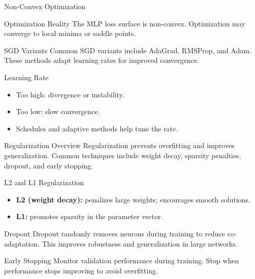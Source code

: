 \documentclass[10pt]{beamer}
\begin{document}
\begin{frame}{Non-Convex Optimization}
  \justifying
  \begin{warningbox}{Optimization Reality}
    The MLP loss surface is non-convex. Optimization may converge to local minima or saddle points.
  \end{warningbox}
\end{frame}

\begin{frame}{SGD Variants}
  \justifying
  Common SGD variants include AdaGrad, RMSProp, and Adam.
  These methods adapt learning rates for improved convergence.
\end{frame}

\begin{frame}{Learning Rate}
  \justifying
  \begin{itemize}
    \item Too high: divergence or instability.
    \item Too low: slow convergence.
    \item Schedules and adaptive methods help tune the rate.
  \end{itemize}
\end{frame}

\begin{frame}{Regularization Overview}
  \justifying
  Regularization prevents overfitting and improves generalization.
  Common techniques include weight decay, sparsity penalties, dropout, and early stopping.
\end{frame}

\begin{frame}{L2 and L1 Regularization}
  \justifying
  \begin{itemize}
    \item \textbf{L2 (weight decay):} penalizes large weights; encourages smooth solutions.
    \item \textbf{L1:} promotes sparsity in the parameter vector.
  \end{itemize}
\end{frame}

\begin{frame}{Dropout}
  \justifying
  Dropout randomly removes neurons during training to reduce co-adaptation.
  This improves robustness and generalization in large networks.
\end{frame}

\begin{frame}{Early Stopping}
  \justifying
  Monitor validation performance during training.
  Stop when performance stops improving to avoid overfitting.
\end{frame}
\end{document}
